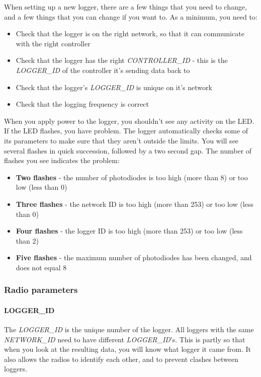 \documentclass[10pt]{article}
\begin{document}
When setting up a new logger, there are a few things that you need to change, and a few things that you can change if you want to. As a minimum, you need to:

\begin{itemize}
 \item Check that the logger is on the right network, so that it can communicate with the right controller
 \item Check that the logger has the right \textit{CONTROLLER\_ID} - this is the \textit{LOGGER\_ID} of the controller it's sending data back to
 \item Check that the logger's \textit{LOGGER\_ID} is unique on it's network
 \item Check that the logging frequency is correct
\end{itemize}

When you apply power to the logger, you shouldn't see any activity on the LED. If the LED flashes, you have problem. The logger automatically checks some of its parameters to make sure that they aren't outside the limits. You will see several flashes in quick succession, followed by a two second gap. The number of flashes you see indicates the problem:

\begin{itemize}
 \item \textbf{Two flashes}	- the number of photodiodes is too high (more than 8) or too low (less than 0)
 \item \textbf{Three flashes}	- the network ID is too high (more than 253) or too low (less than 0)
 \item \textbf{Four flashes}	- the logger ID is too high (more than 253) or too low (less than 2)
 \item \textbf{Five flashes}	- the maximum number of photodiodes has been changed, and does not equal 8
\end{itemize}
   
\subsubsection{Radio parameters}

\paragraph{LOGGER\_ID}
The \textit{LOGGER\_ID} is the unique number of the logger. All loggers with the same \textit{NETWORK\_ID} need to have different \textit{LOGGER\_ID}'s. This is partly so 
that when you look at the resulting data, you will know what logger it came from. It also allows the radios to identify each other, and to prevent clashes between 
loggers. 
\end{document}
